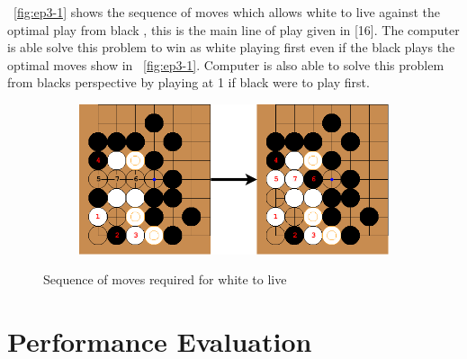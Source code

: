 \documentclass{l4proj}
\begin{document}
~\autoref{fig:ep3-1} shows the sequence of moves which allows white to live against the optimal play from black , this is the main line of play given in [16]. The computer is able solve this problem to win as white playing first even if the black plays the optimal moves show in ~\autoref{fig:ep3-1}. Computer is also able to solve this problem from blacks perspective by playing at 1 if black were to play first.






\begin{figure}[!h]
\centering
\begin{subfigure}[b]{\textwidth}
\centering
\includegraphics[width=\textwidth]{ep3/ep3-1.png}
\end{subfigure}
\caption{Sequence of moves required for white to live}
\label{fig:ep3-1}
\end{figure}

\section{Performance Evaluation}


%
%
\end{document}
